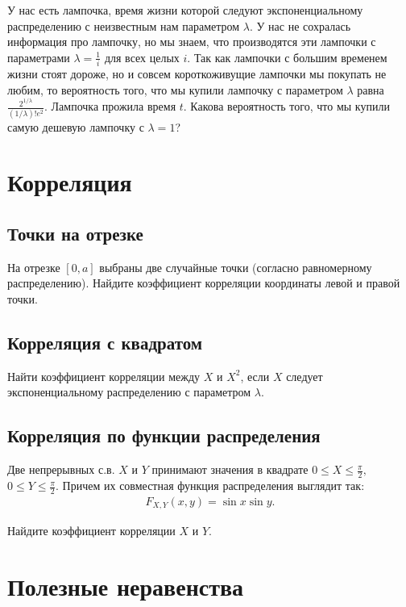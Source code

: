 \documentclass[12pt]{article}
\begin{document}
У нас есть лампочка, время жизни которой следуют экспоненциальному распределению с неизвестным нам параметром $\lambda$. У нас не сохралась информация про лампочку, но мы знаем, что производятся эти лампочки с параметрами $\lambda = \frac{1}{i}$ для всех целых $i$. Так как лампочки с большим временем жизни стоят дороже, но и совсем короткоживущие лампочки мы покупать не любим, то вероятность того, что мы купили лампочку с параметром $\lambda$ равна $\frac{2^{1/\lambda}}{(1/\lambda)!e^2}$. Лампочка прожила время $t$. Какова вероятность того, что мы купили самую дешевую лампочку с $\lambda = 1$?


\section{Корреляция}

\subsection{Точки на отрезке}

На отрезке $[0, a]$ выбраны две случайные точки (согласно равномерному распределению). Найдите коэффициент корреляции координаты левой и правой точки. 

\subsection{Корреляция с квадратом}

Найти коэффициент корреляции между $X$ и $X^2$, если $X$ следует экспоненциальному распределению с параметром $\lambda$.

\subsection{Корреляция по функции распределения}

Две непрерывных с.в. $X$ и $Y$ принимают значения в квадрате $0 \le X \le \frac{\pi}{2},$ $0 \le Y \le \frac{\pi}{2}$. Причем их совместная функция распределения выглядит так:
\begin{align*}
    F_{X, Y} (x, y) = \sin x \sin y.
\end{align*}

Найдите коэффициент корреляции $X$ и $Y$.

\section{Полезные неравенства}
\end{document}
